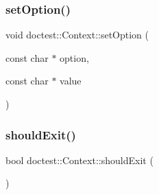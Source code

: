 \subsubsection{\texorpdfstring{set\+Option()}{setOption()}\hspace{0.1cm}{\footnotesize\ttfamily [2/2]}}
{\footnotesize\ttfamily void doctest\+::\+Context\+::set\+Option (\begin{DoxyParamCaption}\item[{const char $\ast$}]{option,  }\item[{const char $\ast$}]{value }\end{DoxyParamCaption})}

\mbox{\label{classdoctest_1_1_context_a219b10301380b81c84c0824a6876d9aa}} 
\subsubsection{\texorpdfstring{should\+Exit()}{shouldExit()}}
{\footnotesize\ttfamily bool doctest\+::\+Context\+::should\+Exit (\begin{DoxyParamCaption}{ }\end{DoxyParamCaption})}

